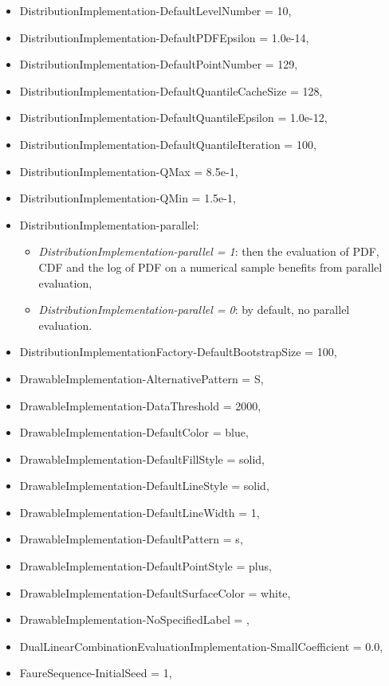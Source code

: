 \begin{itemize}
\item
  DistributionImplementation-DefaultLevelNumber = 10,
\item
  DistributionImplementation-DefaultPDFEpsilon = 1.0e-14,
\item
  DistributionImplementation-DefaultPointNumber = 129,
\item
  DistributionImplementation-DefaultQuantileCacheSize = 128,
\item
  DistributionImplementation-DefaultQuantileEpsilon = 1.0e-12,
\item
  DistributionImplementation-DefaultQuantileIteration = 100,
\item
  DistributionImplementation-QMax = 8.5e-1,
\item
  DistributionImplementation-QMin = 1.5e-1,
\item DistributionImplementation-parallel:
  \begin{itemize}
  \item \textit{DistributionImplementation-parallel = 1}: then the evaluation
    of PDF, CDF and the log of PDF on a numerical sample benefits from  parallel evaluation,
  \item \textit{DistributionImplementation-parallel = 0}: by default, no
    parallel evaluation.
  \end{itemize}
\item
  DistributionImplementationFactory-DefaultBootstrapSize = 100,
\item
  DrawableImplementation-AlternativePattern = S,
\item
  DrawableImplementation-DataThreshold = 2000,
\item
  DrawableImplementation-DefaultColor = blue,
\item
  DrawableImplementation-DefaultFillStyle = solid,
\item
  DrawableImplementation-DefaultLineStyle = solid,
\item
  DrawableImplementation-DefaultLineWidth = 1,
\item
  DrawableImplementation-DefaultPattern = s,
\item
  DrawableImplementation-DefaultPointStyle = plus,
\item
  DrawableImplementation-DefaultSurfaceColor = white,
\item
  DrawableImplementation-NoSpecifiedLabel = ,
\item
  DualLinearCombinationEvaluationImplementation-SmallCoefficient = 0.0,
\item
  FaureSequence-InitialSeed = 1,

\end{itemize}
